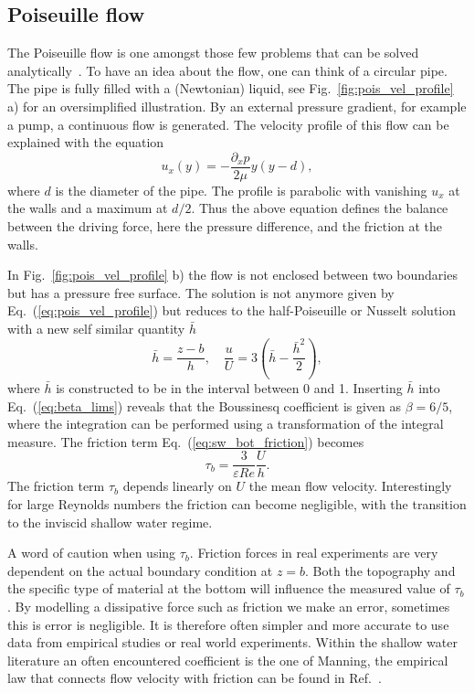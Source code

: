 \subsection{Poiseuille flow}
The Poiseuille flow is one amongst those few problems that can be solved analytically~\cite{suteraHistoryPoiseuilleLaw}.
To have an idea about the flow, one can think of a circular pipe.
The pipe is fully filled with a (Newtonian) liquid, see Fig.~\ref{fig:pois_vel_profile} a) for an oversimplified illustration.
By an external pressure gradient, for example a pump, a continuous flow is generated.
The velocity profile of this flow can be explained with the equation~\cite{batchelorIntroductionFluidDynamics1967, krugerLatticeBoltzmannMethod2017}
\begin{equation}\label{eq:pois_vel_profile}
    u_x(y) = -\frac{\partial_x p}{2\mu}y(y-d),
\end{equation}
where $d$ is the diameter of the pipe.
The profile is parabolic with vanishing $u_x$ at the walls and a maximum at $d/2$. 
Thus the above equation defines the balance between the driving force, here the pressure difference, and the friction at the walls.

In Fig.~\ref{fig:pois_vel_profile} b) the flow is not enclosed between two boundaries but has a pressure free surface.
The solution is not anymore given by Eq.~(\ref{eq:pois_vel_profile}) but reduces to the half-Poiseuille or Nusselt solution with a new self similar quantity $\bar{h}$~\cite{jamesNewFrictionModel2019}
\begin{equation}\label{eq:bar_h}
    \bar{h} = \frac{z - b}{h}, \quad \frac{u}{U} = 3\left(\bar{h} - \frac{\bar{h}^2}{2}\right), 
\end{equation}
where $\bar{h}$ is constructed to be in the interval between 0 and 1.
Inserting $\bar{h}$ into Eq.~(\ref{eq:beta_lims}) reveals that the Boussinesq coefficient is given as $\beta = 6/5$, where the integration can be performed using a transformation of the integral measure.
The friction term Eq.~(\ref{eq:sw_bot_friction}) becomes 
\begin{equation}
    \tau_b = \frac{3}{\varepsilon Re}\frac{U}{h} .
\end{equation}
The friction term $\tau_b$ depends linearly on $U$ the mean flow velocity.
Interestingly for large Reynolds numbers the friction can become negligible, with the transition to the inviscid shallow water regime.

A word of caution when using $\tau_b$.
Friction forces in real experiments are very dependent on the actual boundary condition at $z = b$.
Both the topography and the specific type of material at the bottom will influence the measured value of $\tau_b$. 
By modelling a dissipative force such as friction we make an error, sometimes this is error is negligible.
It is therefore often simpler and more accurate to use data from empirical studies or real world experiments.
Within the shallow water literature an often encountered coefficient is the one of Manning, the empirical law that connects flow velocity with friction can be found in Ref.~\cite{f.asceOpenChannelHydraulics2021}.

